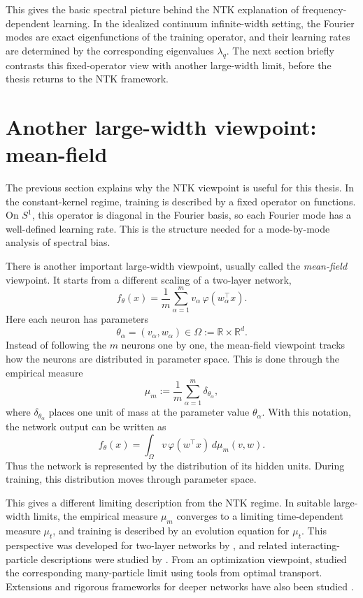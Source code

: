 This gives the basic spectral picture behind the NTK explanation of
frequency-dependent learning. In the idealized continuum infinite-width
setting, the Fourier modes are exact eigenfunctions of the training operator,
and their learning rates are determined by the corresponding eigenvalues
\(\lambda_q\). The next section briefly contrasts this fixed-operator view with
another large-width limit, before the thesis returns to the NTK framework.

\section{Another large-width viewpoint: mean-field}
\label{sec:background-mean-field-brief}

The previous section explains why the NTK viewpoint is useful for this thesis.
In the constant-kernel regime, training is described by a fixed operator on
functions. On \(S^1\), this operator is diagonal in the Fourier basis, so each
Fourier mode has a well-defined learning rate. This is the structure needed for
a mode-by-mode analysis of spectral bias.

There is another important large-width viewpoint, usually called the
\emph{mean-field} viewpoint. It starts from a different scaling of a two-layer
network,
\[
	f_\theta(x)
	=
	\frac{1}{m}
	\sum_{\alpha=1}^m
	v_\alpha\,\varphi(w_\alpha^\top x).
\]
Here each neuron has parameters
\[
	\theta_\alpha=(v_\alpha,w_\alpha)
	\in
	\Omega:=\mathbb R\times\mathbb R^d .
\]
Instead of following the \(m\) neurons one by one, the mean-field viewpoint
tracks how the neurons are distributed in parameter space. This is done through
the empirical measure
\[
	\mu_m
	:=
	\frac{1}{m}
	\sum_{\alpha=1}^m \delta_{\theta_\alpha},
\]
where \(\delta_{\theta_\alpha}\) places one unit of mass at the parameter value
\(\theta_\alpha\). With this notation, the network output can be written as
\[
	f_\theta(x)
	=
	\int_\Omega v\,\varphi(w^\top x)\,d\mu_m(v,w).
\]
Thus the network is represented by the distribution of its hidden units. During
training, this distribution moves through parameter space.

This gives a different limiting description from the NTK regime. In suitable
large-width limits, the empirical measure \(\mu_m\) converges to a limiting
time-dependent measure \(\mu_t\), and training is described by an evolution
equation for \(\mu_t\). This perspective was developed for two-layer networks
by \citet{Mei2018meanfieldview}, and related interacting-particle descriptions
were studied by \citet{Rotskoff_2022}. From an optimization viewpoint,
\citet{chizat2018globalconvergencegradientdescent} studied the corresponding
many-particle limit using tools from optimal transport. Extensions and rigorous
frameworks for deeper networks have also been studied
\citep{nguyen2019meanfieldlimitlearning,araujo2019meanfieldlimitcertaindeep,
	sirignano2019meanfieldanalysisneural,nguyen2023rigorousframeworkmeanfield}.

